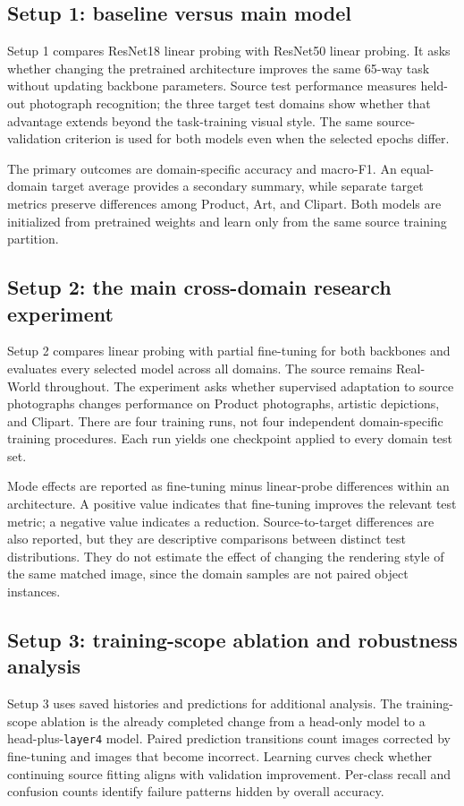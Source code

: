 \documentclass[10pt,a4paper]{article}
\begin{document}
\subsection{Setup 1: baseline versus main model}
Setup 1 compares ResNet18 linear probing with ResNet50 linear probing. It asks whether changing the pretrained architecture improves the same 65-way task without updating backbone parameters. Source test performance measures held-out photograph recognition; the three target test domains show whether that advantage extends beyond the task-training visual style. The same source-validation criterion is used for both models even when the selected epochs differ.

The primary outcomes are domain-specific accuracy and macro-F1. An equal-domain target average provides a secondary summary, while separate target metrics preserve differences among Product, Art, and Clipart. Both models are initialized from pretrained weights and learn only from the same source training partition.


\subsection{Setup 2: the main cross-domain research experiment}
Setup 2 compares linear probing with partial fine-tuning for both backbones and evaluates every selected model across all domains. The source remains Real-World throughout. The experiment asks whether supervised adaptation to source photographs changes performance on Product photographs, artistic depictions, and Clipart. There are four training runs, not four independent domain-specific training procedures. Each run yields one checkpoint applied to every domain test set.

Mode effects are reported as fine-tuning minus linear-probe differences within an architecture. A positive value indicates that fine-tuning improves the relevant test metric; a negative value indicates a reduction. Source-to-target differences are also reported, but they are descriptive comparisons between distinct test distributions. They do not estimate the effect of changing the rendering style of the same matched image, since the domain samples are not paired object instances.

\subsection{Setup 3: training-scope ablation and robustness analysis}
Setup 3 uses saved histories and predictions for additional analysis. The training-scope ablation is the already completed change from a head-only model to a head-plus-\texttt{layer4} model. Paired prediction transitions count images corrected by fine-tuning and images that become incorrect. Learning curves check whether continuing source fitting aligns with validation improvement. Per-class recall and confusion counts identify failure patterns hidden by overall accuracy.
\end{document}
